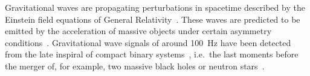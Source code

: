 Gravitational waves are propagating perturbations in spacetime described by the Einstein field equations of General Relativity~\cite{}. %
These waves are predicted to be emitted by the acceleration of massive objects under certain asymmetry conditions~\cite{}. %
Gravitational wave signals of around 100~Hz have been detected from the late inspiral of compact binary systems~\cite{}, i.e.\ the last moments before the merger of, for example, two massive black holes or neutron stars~\cite{}.
